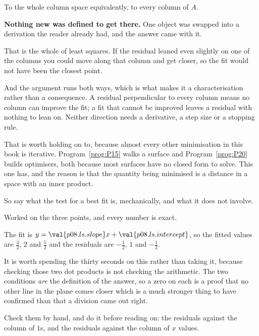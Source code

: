 \begin{fr}
\begin{ansblock}
To the whole column space \dash{} equivalently, to every column of $A$.
\end{ansblock}

\textbf{Nothing new was defined to get there.} One object was swapped into a
derivation the reader already had, and the answer came with it.

That is the whole of least squares. If the residual leaned even slightly on one
of the columns you could move along that column and get closer, so the fit
would not have been the closest point.

And the argument runs both ways, which is what makes it a characterisation
rather than a consequence. A residual perpendicular to every column means no
column can improve the fit; a fit that cannot be improved leaves a residual
with nothing to lean on. Neither direction needs a derivative, a step size or
a stopping rule.

That is worth holding on to, because almost every other minimisation in this
book is iterative. Program~\ref{prog:P15} walks a surface and
Program~\ref{prog:P20} builds optimisers, both because most surfaces have no
closed form to solve. This one has, and the reason is that the quantity being
minimised is a distance in a space with an inner product.

So say what the test for a best fit is, mechanically, and what it does not
involve.
\dotline
\nextframe
\end{fr}

\begin{fr}
Worked on the three points, and every number is exact.

The fit is $y = \val{p08.ls.slope}x + \val{p08.ls.intercept}$, so the fitted
values are $\frac{3}{2}$, $2$ and $\frac{5}{2}$ and the residuals are
$-\frac{1}{2}$, $1$ and $-\frac{1}{2}$.

It is worth spending the thirty seconds on this rather than taking it, because
checking those two dot products is not checking the arithmetic. The two
conditions \emph{are} the definition of the answer, so a zero on each is a
proof that no other line in the plane comes closer \dash{} which is a much
stronger thing to have confirmed than that a division came out right.

Check them by hand, and do it before reading on: the residuals against the
column of $1$s, and the residuals against the column of $x$ values.
\dotline
\nextframe
\end{fr}

